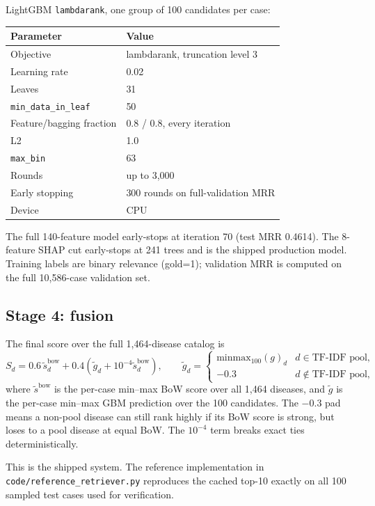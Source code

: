 \documentclass[11pt,a4paper]{article}
\newcommand{\code}[1]{\texttt{\small #1}}
\begin{document}
LightGBM \code{lambdarank}, one group of 100 candidates per case:
\begin{center}
\begin{tabular}{ll}
\toprule
Parameter & Value\\
\midrule
Objective & lambdarank, truncation level 3\\
Learning rate & 0.02\\
Leaves & 31\\
\code{min\_data\_in\_leaf} & 50\\
Feature/bagging fraction & 0.8 / 0.8, every iteration\\
L2 & 1.0\\
\code{max\_bin} & 63\\
Rounds & up to 3,000\\
Early stopping & 300 rounds on full-validation MRR\\
Device & CPU\\
\bottomrule
\end{tabular}
\end{center}

The full 140-feature model early-stops at iteration 70 (test MRR 0.4614). The
8-feature SHAP cut early-stops at 241 trees and is the shipped production model.
Training labels are binary relevance (gold=1); validation MRR is computed on the
full 10,586-case validation set.

\subsection{Stage 4: fusion}

The final score over the full 1,464-disease catalog is
\begin{equation}
S_d = 0.6\,\tilde{s}^{\mathrm{bow}}_d
      + 0.4\left(\tilde{g}_d + 10^{-4}\tilde{s}^{\mathrm{bow}}_d\right),
\qquad
\tilde{g}_d =
\begin{cases}
\mathrm{minmax}_{100}(g)_d & d\in\text{TF-IDF pool},\\
-0.3 & d\notin\text{TF-IDF pool},
\end{cases}
\end{equation}
where $\tilde{s}^{\mathrm{bow}}$ is the per-case min--max BoW score over all 1,464
diseases, and $\tilde{g}$ is the per-case min--max GBM prediction over the 100
candidates. The $-0.3$ pad means a non-pool disease can still rank highly if its
BoW score is strong, but loses to a pool disease at equal BoW. The $10^{-4}$ term
breaks exact ties deterministically.

This is the shipped system. The reference implementation in
\code{code/reference\_retriever.py} reproduces the cached top-10 exactly on all 100
sampled test cases used for verification.
\end{document}
